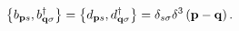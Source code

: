 \begin{equation}
\left\{ b_{\mathbf{p}s},b_{\mathbf{q}\sigma }^{\dagger }\right\} =\left\{ d_{%
\mathbf{p}s},d_{\mathbf{q}\sigma }^{\dagger }\right\} =\delta _{s\sigma
}\delta ^{3}\left( \mathbf{p}-\mathbf{q}\right) .
\end{equation}

